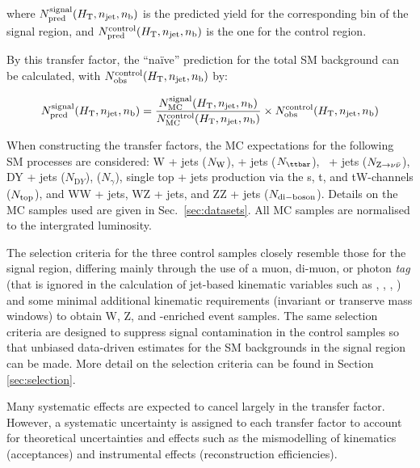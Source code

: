 where $N_{\textrm{pred}}^{\rm signal}(\mbox{$H_\text{T}$},n_{\text{jet}},n_{\text{b}})$ is the predicted yield for the corresponding bin of the signal region, and $N_{\textrm{pred}}^{\rm control}(\mbox{$H_\text{T}$},n_{\text{jet}},n_{\text{b}})$ is the one for the control region.

By this transfer factor, the ``na\"ive'' prediction for the total SM background can be calculated, with $N_{\textrm{obs}}^{\rm control}(\mbox{$H_\text{T}$},n_{\text{jet}},n_{\text{b}})$ by:

\begin{equation}
  \label{equ:pred-method}
  N_{\textrm{pred}}^{\rm signal}(\mbox{$H_\text{T}$},n_{\text{jet}},n_{\text{b}}) = \frac{N_{\rm MC}^{\rm
      signal}(\mbox{$H_\text{T}$},n_{\text{jet}},n_{\text{b}})}{N_{\rm MC}^{\rm
      control}(\mbox{$H_\text{T}$},n_{\text{jet}},n_{\text{b}})} \times N_{\textrm{obs}}^{\rm
    control}(\mbox{$H_\text{T}$},n_{\text{jet}},n_{\text{b}})   
\end{equation}

When constructing the transfer factors, the MC expectations for the following SM processes are considered: W + jets ($N_{\rm W}$), \ttbar + jets ($N_{\ttbar}$), \znunu\ + jets ($N_{{\text Z} \rightarrow \nu\bar{\nu}}$), DY + jets ($N_{\mathrm DY}$), \gj ($N_\gamma$), single top + jets production via the s, t, and tW-channels ($N_{\rm top}$), and WW + jets, WZ + jets, and ZZ + jets ($N_{\rm di-boson}$). Details on the MC samples used are given in Sec.~\ref{sec:datasets}. All MC samples are normalised to the intergrated luminosity.

The selection criteria for the three control samples closely resemble those for the signal region, differing mainly through the use of a muon, di-muon, or photon {\it tag} (that is ignored in the calculation of jet-based kinematic variables such as \scalht, \mht, \alphat, \etc) and some minimal additional kinematic requirements (\eg invariant or transerve mass windows) to obtain W, Z, and \ttbar-enriched event samples. The same selection criteria are designed to suppress signal contamination in the control samples so that unbiased data-driven estimates for the SM backgrounds in the signal region can be made. More detail on the selection criteria can be found in Section \ref{sec:selection}.

Many systematic effects are expected to cancel largely in the transfer factor. However, a systematic uncertainty is assigned to each transfer factor to account for theoretical uncertainties and effects such as the mismodelling of kinematics (\eg acceptances) and instrumental effects (\eg reconstruction efficiencies).

